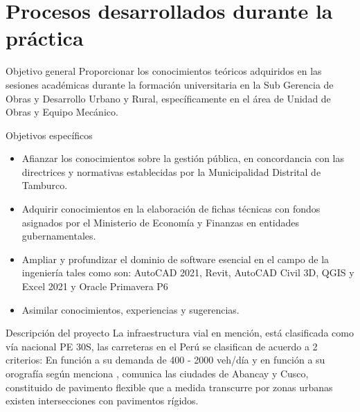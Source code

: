 \section{Procesos desarrollados durante la práctica}
\begin{frame}{Objetivo general}%
    Proporcionar los conocimientos teóricos adquiridos en las sesiones académicas durante la formación universitaria en la Sub Gerencia de Obras y Desarrollo Urbano y Rural, específicamente en el área de Unidad de Obras y Equipo Mecánico.
\end{frame}

\begin{frame}{Objetivos específicos}
    \begin{itemize}
        \item Afianzar los conocimientos sobre la gestión pública, en concordancia con las directrices y normativas establecidas por la Municipalidad Distrital de Tamburco.
        \item Adquirir conocimientos en la elaboración de fichas técnicas con fondos asignados por el Ministerio de Economía y Finanzas en entidades gubernamentales.
        \item Ampliar y profundizar el dominio de software esencial en el campo de la ingeniería tales como son: AutoCAD 2021, Revit, AutoCAD Civil 3D, QGIS y Excel 2021 y Oracle Primavera P6 %
        \item Asimilar conocimientos, experiencias y sugerencias.
     \end{itemize} 
\end{frame}
\begin{frame}{Descripción del proyecto}
    La infraestructura vial en mención, está clasificada como vía nacional  PE 30S, las carreteras en el Perú se clasifican de acuerdo a 2 criterios: En función a su demanda de 400 - 2000 veh/día y en función a su orografía según menciona \cite[12]{MTC2018}, comunica las ciudades de Abancay y Cusco, constituido de pavimento flexible que a medida transcurre por zonas urbanas existen intersecciones con pavimentos rígidos.
\end{frame}

